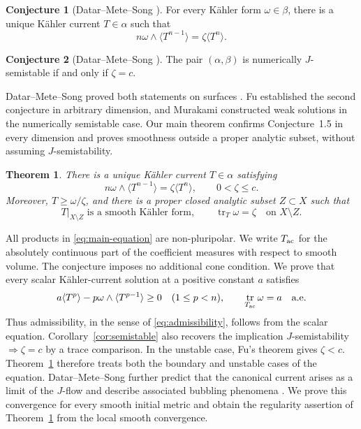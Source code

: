 \documentclass[reqno]{amsart}
\numberwithin{equation}{section}
\newtheorem{theorem}{Theorem}[section]
\theoremstyle{definition}
\newtheorem*{conjecture}{Conjecture}
\DeclareMathOperator{\tr}{tr}
\begin{document}
\begin{conjecture}[Datar--Mete--Song {\cite[Conjecture~1.5]{DMS26}}]
For every K\"ahler form $\omega\in\beta$, there is a unique
K\"ahler current $T\in\alpha$ such that
\[
 n\omega\wedge\langle T^{n-1}\rangle=\zeta\langle T^n\rangle.
\]
\end{conjecture}

\begin{conjecture}[Datar--Mete--Song {\cite[Conjecture~2.14]{DMS26}}]
The pair $(\alpha,\beta)$ is numerically $J$-semistable
if and only if $\zeta=c$.
\end{conjecture}

Datar--Mete--Song proved both statements on surfaces
\cite[Theorem~1.4]{DMS26}. Fu \cite{F26} established the second
conjecture in arbitrary dimension, and Murakami \cite{M26b}
constructed weak solutions in the numerically semistable case.
Our main theorem confirms Conjecture~1.5 in every dimension
and proves smoothness outside a proper analytic subset, without
assuming $J$-semistability.

\begin{theorem}\label{thm:main}
There is a unique K\"ahler current $T\in\alpha$ satisfying
\begin{equation}\label{eq:main-equation}
 n\omega\wedge\langle T^{n-1}\rangle=\zeta\langle T^n\rangle,
 \qquad 0<\zeta\le c.
\end{equation}
Moreover, $T\ge\omega/\zeta$, and there is a proper closed analytic subset $Z\subset X$ such that
\[
 T|_{X\setminus Z}\text{ is a smooth K\"ahler form},\qquad
 \tr_T\omega=\zeta\quad\text{on }X\setminus Z.
\] 
\end{theorem}

All products in \eqref{eq:main-equation} are non-pluripolar. We write $T_{\rm ac}$ for the absolutely continuous part of the coefficient measures with respect to smooth volume. The conjecture imposes no additional cone condition. We prove that every scalar K\"ahler-current solution at a positive constant $a$ satisfies
\begin{equation}\label{eq:admissibility}
 a\langle T^p\rangle-p\omega\wedge\langle T^{p-1}\rangle\ge0
 \quad(1\le p<n),
 \qquad \tr_{T_{\rm ac}}\omega=a\quad\text{a.e.}
\end{equation}
Thus admissibility, in the sense of \eqref{eq:admissibility}, follows from the scalar equation.
Corollary~\ref{cor:semistable} also recovers
the implication $J$-semistability $\Longrightarrow\zeta=c$
by a trace comparison. In the unstable case, Fu's theorem gives
$\zeta<c$. Theorem~\ref{thm:main}
therefore treats both the boundary and unstable cases of the
equation. Datar--Mete--Song further predict that the canonical
current arises as a limit of the $J$-flow and describe associated
bubbling phenomena \cite[Section~1.2]{DMS26}. We prove this
convergence for every smooth initial metric and obtain the regularity
assertion of Theorem~\ref{thm:main} from the local smooth convergence.
\end{document}
